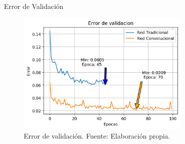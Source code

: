 \documentclass[10pt]{beamer}
\begin{document}
\begin{frame}{Error de Validación}
    \begin{figure}[!ht] 
        \centering
        \includegraphics[width=0.75\textwidth]{../img/valloss}
        \caption[Error de validación]{Error de validación. Fuente: Elaboración propia. }
        \label{fig:valloss}
    \end{figure}
    
\end{frame}


    
\end{document}
